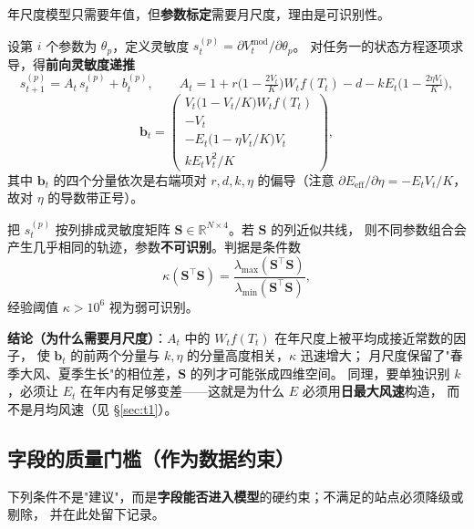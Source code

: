 \documentclass[11pt,a4paper]{ctexart}
\newcommand{\R}{\mathbb{R}}
\begin{document}
年尺度模型只需要年值，但\textbf{参数标定}需要月尺度，理由是可识别性。

设第 $i$ 个参数为 $\theta_p$，定义灵敏度 $s_t^{(p)}=\partial V_t^{\mathrm{mod}}/\partial\theta_p$。
对任务一的状态方程逐项求导，得\textbf{前向灵敏度递推}
\begin{equation}\label{eq:sens}
s_{t+1}^{(p)}=A_t\,s_t^{(p)}+b_t^{(p)},\qquad
A_t=1+r\Big(1-\tfrac{2V_t}{K}\Big)W_tf(T_t)-d-kE_t\Big(1-\tfrac{2\eta V_t}{K}\Big),
\end{equation}
\begin{equation}\label{eq:sensb}
\bm{b}_t=
\begin{pmatrix}
V_t\big(1-V_t/K\big)W_tf(T_t)\\[2pt]
-V_t\\[2pt]
-E_t\big(1-\eta V_t/K\big)V_t\\[2pt]
kE_tV_t^{2}/K
\end{pmatrix},
\end{equation}
其中 $\bm{b}_t$ 的四个分量依次是右端项对 $r,d,k,\eta$ 的偏导（注意
$\partial E_{\mathrm{eff}}/\partial\eta=-E_tV_t/K$，故对 $\eta$ 的导数带正号）。

把 $s_t^{(p)}$ 按列排成灵敏度矩阵 $\bm{S}\in\R^{N\times4}$。若 $\bm{S}$ 的列近似共线，
则不同参数组合会产生几乎相同的轨迹，参数\textbf{不可识别}。判据是条件数
\begin{equation}\label{eq:cond}
\kappa(\bm{S}^{\top}\bm{S})=\frac{\lambda_{\max}(\bm{S}^{\top}\bm{S})}{\lambda_{\min}(\bm{S}^{\top}\bm{S})},
\end{equation}
经验阈值 $\kappa>10^{6}$ 视为弱可识别。

\textbf{结论（为什么需要月尺度）}：$A_t$ 中的 $W_t f(T_t)$ 在年尺度上被平均成接近常数的因子，
使 $\bm{b}_t$ 的前两个分量与 $k,\eta$ 的分量高度相关，$\kappa$ 迅速增大；
月尺度保留了"春季大风、夏季生长"的相位差，$\bm{S}$ 的列才可能张成四维空间。
同理，要单独识别 $k$，必须让 $E_t$ 在年内有足够变差——这就是为什么 $E$ 必须用\textbf{日最大风速}构造，
而不是月均风速（见 \S\ref{sec:t1}）。

\subsection{字段的质量门槛（作为数据约束）}

下列条件不是"建议"，而是\textbf{字段能否进入模型}的硬约束；不满足的站点必须降级或剔除，
并在此处留下记录。
\end{document}
